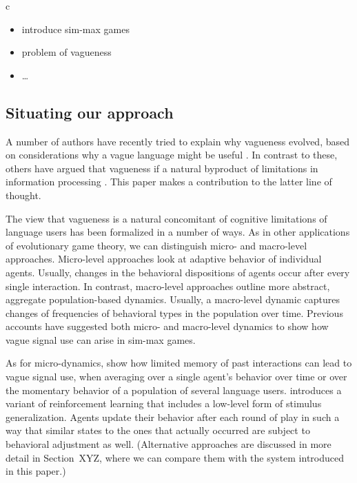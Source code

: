 c

\bigskip





\begin{itemize}
\item introduce sim-max games
\item problem of vagueness \citep{Lipman2009:Why-is-Language}
\item \dots
\end{itemize}

\subsection{Situating our approach}

A number of authors have recently tried to explain why vagueness
evolved, based on considerations why a vague language might be useful
\citep[e.g.][]{Jaegherde-Jaegher2003:A-Game-Theoreti,Deemter2009:Utility-and-Lan,Jaegherde-JaegherRooijvan-Rooij2010:Strategic-Vague,BlumeBoard2013:Intentional-Vag}. In
contrast to these, others have argued that vagueness if a natural
byproduct of limitations in information processing
\citep[e.g.][]{FrankeJager2010:Vagueness-Signa,OConnor2013:The-Evolution-o}. This
paper makes a contribution to the latter line of thought.

The view that vagueness is a natural concomitant of cognitive
limitations of language users has been formalized in a number of
ways. As in other applications of evolutionary game theory, we can
distinguish micro- and macro-level approaches. Micro-level approaches
look at adaptive behavior of individual agents. Usually, changes in
the behavioral dispositions of agents occur after every single
interaction. In contrast, macro-level approaches outline more
abstract, aggregate population-based dynamics. Usually, a macro-level
dynamic captures changes of frequencies of behavioral types in the
population over time. Previous accounts have suggested both micro- and
macro-level dynamics to show how vague signal use can arise in sim-max
games.

As for micro-dynamics, \citet{FrankeJager2010:Vagueness-Signa} show
how limited memory of past interactions can lead to vague signal use,
when averaging over a single agent's behavior over time or over the
momentary behavior of a population of several language
users. \citet{OConnor2013:The-Evolution-o} introduces a variant of
reinforcement learning that includes a low-level form of stimulus
generalization. Agents update their behavior after each round of play
in such a way that similar states to the ones that actually occurred
are subject to behavioral adjustment as well. (Alternative approaches
are discussed in more detail in Section~XYZ, where we can compare them
with the system introduced in this paper.)

